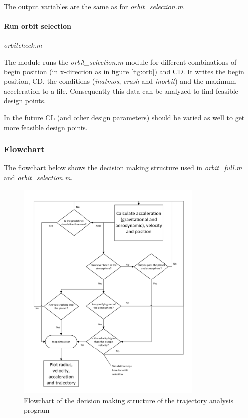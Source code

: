 The output variables are the same as for \textit{orbit\_selection.m}.

\paragraph{Run orbit selection} \textit{orbitcheck.m}

The module runs the \textit{orbit\_selection.m} module for different combinations of begin position (in x-direction as in figure \ref{fig:orb}) and \gls{CD}. It writes the begin position, \gls{CD}, the conditions (\textit{inatmos}, \textit{crash} and \textit{inorbit}) and the maximum acceleration to a file. Consequently this data can be analyzed to find feasible design points.

In the future \gls{CL} (and other design parameters) should be varied as well to get more feasible design points.

\subsubsection{Flowchart} \label{subsec:flow}

The flowchart below shows the decision making structure used in \textit{orbit\_full.m} and \textit{orbit\_selection.m}.

\begin{figure}[H]
\centering
\hspace{-23mm}
\includegraphics[width = 0.8\textwidth]{Figure/astro_tool.pdf}
\vspace{-5mm}
\caption{Flowchart of the decision making structure of the trajectory analysis program}
\label{fig:traj_flow}
\end{figure}

